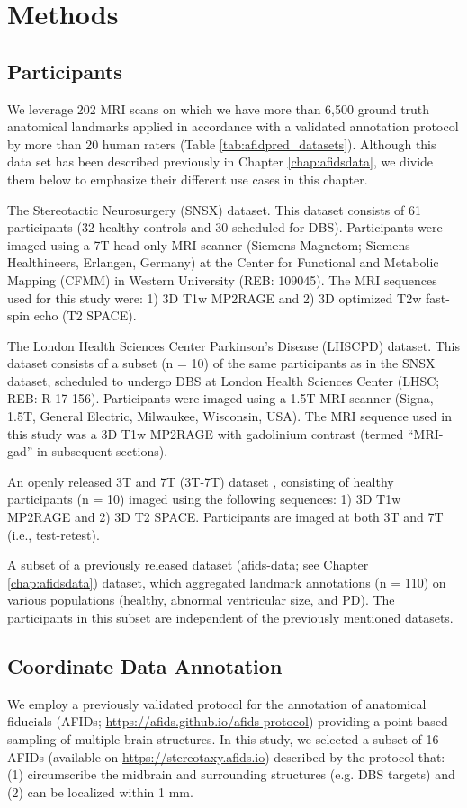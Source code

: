 \section{Methods}

\subsection{Participants}
We leverage 202 MRI scans on which we have more than 6,500 ground truth anatomical landmarks applied in accordance with a validated annotation protocol \cite{Lau2019-eh} by more than 20 human raters (Table \ref{tab:afidpred_datasets}). Although this data set has been described previously in Chapter \ref{chap:afidsdata}, we divide them below to emphasize their different use cases in this chapter. 

The Stereotactic Neurosurgery (SNSX) dataset. This dataset consists of 61 participants (32 healthy controls and 30 scheduled for DBS). Participants were imaged using a 7T head-only MRI scanner (Siemens Magnetom; Siemens Healthineers, Erlangen, Germany) at the Center for Functional and Metabolic Mapping (CFMM) in Western University (REB: 109045). The MRI sequences used for this study were: 1) 3D T1w MP2RAGE and 2) 3D optimized T2w fast-spin echo (T2 SPACE).

The London Health Sciences Center Parkinson’s Disease (LHSCPD) dataset. This dataset consists of a subset (n = 10) of the same participants as in the SNSX dataset, scheduled to undergo DBS at London Health Sciences Center (LHSC; REB: R-17-156). Participants were imaged using a 1.5T MRI scanner (Signa, 1.5T, General Electric, Milwaukee, Wisconsin, USA). The MRI sequence used in this study was a 3D T1w MP2RAGE with gadolinium contrast (termed “MRI-gad” in subsequent sections).

An openly released 3T and 7T (3T-7T) dataset \cite{Chen2023-cn}, consisting of healthy participants (n = 10) imaged using the following sequences: 1) 3D T1w MP2RAGE and 2) 3D T2 SPACE. Participants are imaged at both 3T and 7T (i.e., test-retest).

A subset of a previously released dataset (afids-data; see Chapter \ref{chap:afidsdata}) dataset, which aggregated landmark annotations (n = 110) on various populations (healthy, abnormal ventricular size, and PD). The participants in this subset are independent of the previously mentioned datasets.

\subsection{Coordinate Data Annotation}
We employ a previously validated protocol for the annotation of anatomical fiducials (AFIDs; \url{https://afids.github.io/afids-protocol}) providing a point-based sampling of multiple brain structures. In this study, we selected a subset of 16 AFIDs (available on \url{https://stereotaxy.afids.io}) described by the protocol that: (1) circumscribe the midbrain and surrounding structures (e.g. DBS targets) and (2) can be localized within 1 mm.

